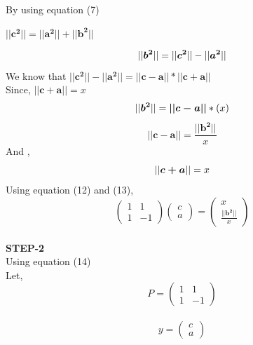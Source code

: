 \documentclass[10pt,a4paper]{report}
\begin{document}
\begin{multicols}{2}
By using equation (7)
\begin{center}
    $ ||\boldsymbol{c^2}|| = ||\boldsymbol{a^2}|| + ||\boldsymbol{b^2}||$ \vspace{2mm}
\end{center}
\begin{equation}
    ||\boldsymbol{b^2}|| = ||\boldsymbol{c^2}|| - ||\boldsymbol{a^2}|| \vspace{2mm}
\end{equation}
We know that $||\boldsymbol{c^2}||- ||\boldsymbol{a^2}|| =  ||\boldsymbol{c-a}||*||\boldsymbol{c+a||}$\vspace{2mm}\\
Since, $ \boldsymbol{||c+a||}=x$
\begin{equation}
   ||\boldsymbol{b^2}|| = \boldsymbol{||c-a||}*(x) \vspace{2mm}
\end{equation}
\begin{equation}
  ||\boldsymbol{c-a}|| = \frac{ ||\boldsymbol{b^2}||}{x}
\end{equation}
And ,
\begin{equation}
   ||\boldsymbol{c+a}|| = x \vspace{2mm}
\end{equation}
Using equation (12) and (13),
\begin{equation}
  \begin{pmatrix}
1 & 1\\
1 &-1
\end{pmatrix} 
\begin{pmatrix}
c\\
a
\end{pmatrix} = \begin{pmatrix}
x\\
\frac{||\boldsymbol{b^2}||}{x}
\end{pmatrix} 
\end{equation}\vspace{2mm}\\

\textbf{STEP-2}\vspace{2mm}\\
Using equation (14) \vspace{2mm}\\
 Let,
\begin{equation}
  P =\begin{pmatrix}
1 & 1\\
1 &-1
\end{pmatrix} 
\end{equation} \\ \vspace{2mm}
\begin{equation}
  y =\begin{pmatrix}
c \\
a
\end{pmatrix} 
\end{equation}  \vspace{2mm}


\end{multicols}
\end{document}
